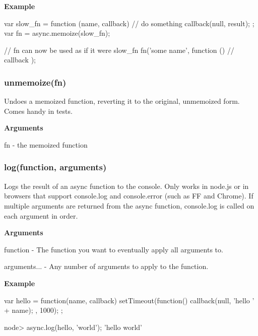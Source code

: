 {\bfseries Example} \begin{DoxyVerb}var slow_fn = function (name, callback) {
    // do something
    callback(null, result);
};
var fn = async.memoize(slow_fn);

// fn can now be used as if it were slow_fn
fn('some name', function () {
    // callback
});
\end{DoxyVerb}


\label{_unmemoize}%
 \subsubsection*{unmemoize(fn)}

Undoes a memoized function, reverting it to the original, unmemoized form. Comes handy in tests.

{\bfseries Arguments}


\begin{DoxyItemize}
\item fn -\/ the memoized function
\end{DoxyItemize}

\label{_log}%
 \subsubsection*{log(function, arguments)}

Logs the result of an async function to the console. Only works in node.\+js or in browsers that support console.\+log and console.\+error (such as FF and Chrome). If multiple arguments are returned from the async function, console.\+log is called on each argument in order.

{\bfseries Arguments}


\begin{DoxyItemize}
\item function -\/ The function you want to eventually apply all arguments to.
\item arguments... -\/ Any number of arguments to apply to the function.
\end{DoxyItemize}

{\bfseries Example} \begin{DoxyVerb}var hello = function(name, callback){
    setTimeout(function(){
        callback(null, 'hello ' + name);
    }, 1000);
};

node> async.log(hello, 'world');
'hello world'
\end{DoxyVerb}






